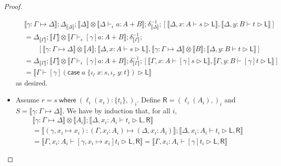 \documentclass[acmsmall,screen,review]{acmart}
\newcommand{\ms}[1]{\ensuremath{\mathsf{#1}}}
\newcommand{\lto}{:}
\newcommand{\linl}[1]{\iota_l\;{#1}}
\newcommand{\linr}[1]{\iota_r\;{#1}}
\newcommand{\casestmt}[5]{\ms{case}\;#1\;\{\linl{#2} \lto #3, \linr{#4} \lto #5\}}
\newcommand{\where}[2]{#1\;\ms{where}\;#2}
\newcommand{\wbranch}[3]{#1(#2) \lto \{#3\}}
\newcommand{\bhyp}[2]{#1 : #2}
\newcommand{\hasty}[4]{#1 \vdash_{#2} #3: {#4}}
\newcommand{\haslb}[3]{#1 \vdash #2 \rhd #3}
\newcommand{\issubst}[3]{#1: #2 \mapsto #3}
\newcommand{\dnt}[1]{\llbracket{#1}\rrbracket}
\begin{document}
\begin{proof}
\begin{itemize}[leftmargin=*]
    \begin{equation}
      \begin{aligned}
        & \dnt{\issubst{\gamma}{\Gamma}{\Delta}}
        ; \Delta_{\dnt{\Delta}} 
        ; \dnt{\Delta} \otimes \dnt{\hasty{\Delta}{\epsilon}{a}{A + B}}
        ; \delta^{-1}_{\dnt{\Delta}} 
        ; [
          \dnt{\haslb{\Delta, \bhyp{x}{A}}{s}{\ms{L}}}, 
          \dnt{\haslb{\Delta, \bhyp{y}{B}}{t}{\ms{L}}}
        ] 
        \\ &
        = \Delta_{\dnt{\Gamma}}
        ; \dnt{\Gamma} \otimes \dnt{\hasty{\Gamma}{\epsilon}{[\gamma]a}{A + B}}
        ; \delta^{-1}_{\dnt{\Gamma}}
        ;  \\ & \qquad
        [
          \dnt{\issubst{\gamma}{\Gamma}{\Delta}} \otimes \dnt{A} 
            ; \dnt{\haslb{\Delta, \bhyp{x}{A}}{s}{\ms{L}}}, 
          \dnt{\issubst{\gamma}{\Gamma}{\Delta}} \otimes \dnt{B} 
            ; \dnt{\haslb{\Delta, \bhyp{y}{B}}{t}{\ms{L}}}
        ] 
        \\ &
        = \Delta_{\dnt{\Gamma}}
        ; \dnt{\Gamma} \otimes \dnt{\hasty{\Gamma}{\epsilon}{[\gamma]a}{A + B}}
        ; \delta^{-1}_{\dnt{\Gamma}} 
        ; [
          \dnt{\haslb{\Gamma, \bhyp{x}{A}}{[\gamma]s}{\ms{L}}}, 
          \dnt{\haslb{\Gamma, \bhyp{y}{B}}{[\gamma]t}{\ms{L}}}
        ]
        \\ &
        = \dnt{\haslb{\Gamma}{[\gamma](\casestmt{a}{x}{s}{y}{t})}{\ms{L}}}
      \end{aligned}
    \end{equation}
    as desired.
    \item Assume $r = \where{s}{(\wbranch{\ell_i}{x_i}{t_i},)_i}$. Define $\ms{R} =
    (\ell_i(A_i),)_i$ and $S = \dnt{\issubst{\gamma}{\Gamma}{\Delta}}$. We have by induction that,
    for all $i$,
    \begin{equation}
      \begin{aligned}
      & \dnt{\issubst{\gamma}{\Gamma}{\Delta}} \otimes \dnt{A_i} 
      ; \dnt{\haslb{\Delta, \bhyp{x_i}{A_i}}{t_i}{\ms{L}, \ms{R}}}
      \\ &= \dnt{\issubst{(\gamma, x_i \mapsto x_i)}  
                  {(\Gamma, \bhyp{x_i}{A_i})}{(\Delta, \bhyp{x_i}{A_i})}}
      ; \dnt{\haslb{\Delta, \bhyp{x_i}{A_i}}{t_i}{\ms{L}, \ms{R}}}
      \\ &= \dnt{\haslb{\Gamma, \bhyp{x_i}{A_i}}{[\gamma, x_i \mapsto x_i]t_i}{\ms{L}, \ms{R}}}
          = \dnt{\haslb{\Gamma, \bhyp{x_i}{A_i}}{[\gamma]t_i}{\ms{L}, \ms{R}}}
      \end{aligned}

\end{equation}
\end{itemize}
\end{proof}
\end{document}
